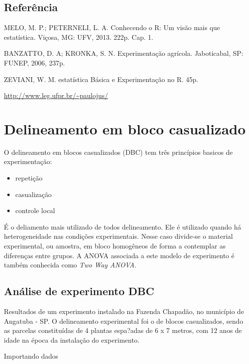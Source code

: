 \documentclass[
]{book}
\begin{document}
\hypertarget{referuxeancia-4}{%
\subsection{Referência}\label{referuxeancia-4}}

MELO, M. P.; PETERNELI, L. A. Conhecendo o R: Um visão mais que estatística. Viçosa, MG: UFV, 2013. 222p. Cap. 1.

BANZATTO, D. A; KRONKA, S. N. Experimentação agrícola. Jaboticabal, SP: FUNEP, 2006, 237p.

ZEVIANI, W. M. estatística Básica e Experimentação no R. 45p.

\url{http://www.leg.ufpr.br/~paulojus/}

\hypertarget{delineamento-em-bloco-casualizado}{%
\section{Delineamento em bloco casualizado}\label{delineamento-em-bloco-casualizado}}

O delineamento em blocos casualizados (DBC) tem três princípios basicos de experimentação:

\begin{itemize}
\item
  repetição
\item
  casualização
\item
  controle local
\end{itemize}

É o deliamento mais utilizado de todos delineamento. Ele é utilizado quando há heterogeneidade nas condições experimentais. Nesse caso divide-se o material experimental, ou amostra, em bloco homogêneos de forma a contemplar as diferenças entre grupos. A ANOVA associada a este modelo de experimento é também conhecida como \emph{Two Way ANOVA}.

\hypertarget{anuxe1lise-de-experimento-dbc}{%
\subsection{Análise de experimento DBC}\label{anuxe1lise-de-experimento-dbc}}

Resultados de um experimento instalado na Fazenda Chapadão, no município de Angatuba - SP. O delineamento experimental foi o de blocos casualizados, sendo as parcelas constituídas de 4 plantas espa?adas de 6 x 7 metros, com 12 anos de idade na época da instalação do experimento.

Importando dados
\end{document}
